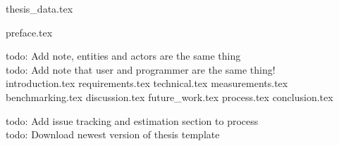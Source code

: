 \documentclass[BSP,english,oneside]{ntnuthesis/ntnubachelorthesis}
\newcommand{\todo}[1]{{\color{cyan}\lbrack todo: #1\rbrack}\\} %
\begin{document}
{thesis_data.tex}

\makefrontpages

{preface.tex}

\tableofcontents
\listoffigures
\listoftables

\todo{Add note, entities and actors are the same thing}
\todo{Add note that user and programmer are the same thing!}

{introduction.tex}
{requirements.tex}
{technical.tex}
{measurements.tex}
{benchmarking.tex}
{discussion.tex}
{future_work.tex}
{process.tex}
{conclusion.tex}




\todo{Add issue tracking and estimation section to process}
\todo{Download newest version of thesis template}
\end{document}
